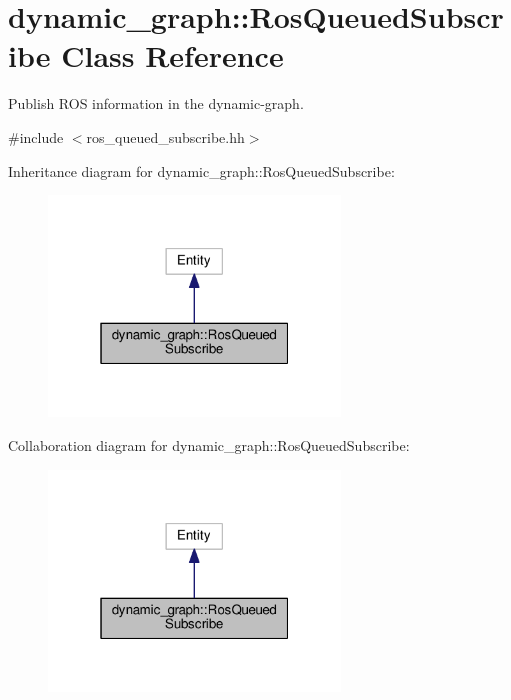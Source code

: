 \hypertarget{classdynamic__graph_1_1RosQueuedSubscribe}{}\section{dynamic\+\_\+graph\+:\+:Ros\+Queued\+Subscribe Class Reference}
\label{classdynamic__graph_1_1RosQueuedSubscribe}


Publish R\+OS information in the dynamic-\/graph.  




{\ttfamily \#include $<$ros\+\_\+queued\+\_\+subscribe.\+hh$>$}



Inheritance diagram for dynamic\+\_\+graph\+:\+:Ros\+Queued\+Subscribe\+:\nopagebreak
\begin{figure}[H]
\begin{center}
\leavevmode
\includegraphics[width=220pt]{classdynamic__graph_1_1RosQueuedSubscribe__inherit__graph}
\end{center}
\end{figure}


Collaboration diagram for dynamic\+\_\+graph\+:\+:Ros\+Queued\+Subscribe\+:\nopagebreak
\begin{figure}[H]
\begin{center}
\leavevmode
\includegraphics[width=220pt]{classdynamic__graph_1_1RosQueuedSubscribe__coll__graph}
\end{center}
\end{figure}
